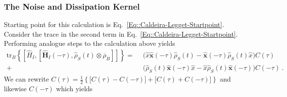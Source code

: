 	\subsubsection{The Noise and Dissipation Kernel}
	Starting point for this calculation is Eq.~\eqref{Eq::Caldeira-Legget-Startpoint}. Consider the trace in the second term in Eq.~\eqref{Eq::Caldeira-Legget-Startpoint}. Performing analogue steps to the calculation above yields
	\begin{equation}
		\begin{split} \label{Eq::Trace-kernel-startpoint}
			 \text{tr}_B \left\{  \left[{\hat{H}}_I, \left[{\boldsymbol{\hat{H}}}_I(- \tau), {\hat{\rho}}_S(t) \otimes \overline{\rho}_B \right]\right]  \right\} =	~~  &\Big (\hat{x} \boldsymbol{\hat{x}}(-\tau) \hat{\rho}_S(t) - \boldsymbol{\hat{x}}(-\tau) \hat{\rho}_S(t) \hat{x}   \Big)  C(\tau) \\
			+& \Big (  \hat{\rho}_S(t) \boldsymbol{\hat{x}}(-\tau) \hat{x}  - \hat{x} \hat{\rho}_S(t) \boldsymbol{\hat{x}}(-\tau)    \Big) C(-\tau)~.
		\end{split}
	\end{equation}
	We can rewrite $C(\tau) = \frac{1}{2}	\left\{ \Big[C(\tau) - C(-\tau) \Big]  + \Big[C(\tau) + C(-\tau)\Big] \right\}$ and likewise $C(-\tau)$ which yields
